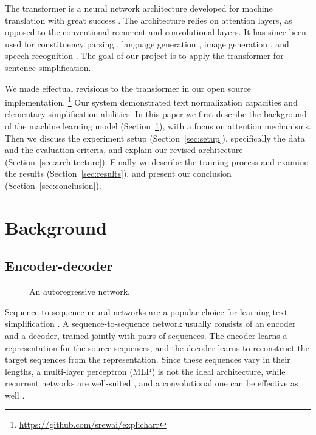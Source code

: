 \documentclass[11pt,twocolumn]{article}
\begin{document}
The transformer is a neural network architecture developed for machine translation
with great success \parencite{vaswani2017attention}.
The architecture relies on attention layers,
as opposed to the conventional recurrent and convolutional layers.
It has since been used for constituency parsing \parencite{kitaev2018constituency},
language generation \parencite{liu2018generating},
image generation \parencite{parmar2018image},
and speech recognition \parencite{zhou2018syllable, zhou2018multilingual}.
The goal of our project is to apply the transformer for sentence simplification.

We made effectual revisions to the transformer in our open source implementation.%
\footnote{\tiny\url{https://github.com/srewai/explicharr}}
Our system demonstrated text normalization capacities and elementary simplification abilities.
In this paper we first describe the background of the machine learning model
(Section~\ref{sec:background}), with a focus on attention mechanisms.
Then we discuss the experiment setup (Section~\ref{sec:setup}),
specifically the data and the evaluation criteria,
and explain our revised architecture (Section~\ref{sec:architecture}).
Finally we describe the training process and examine the results (Section~\ref{sec:results}),
and present our conclusion (Section~\ref{sec:conclusion}).

\section{Background}%
\label{sec:background}

\subsection{Encoder-decoder}

\begin{figure}
  \centering
  \caption[]{\label{fig:autoreg}An autoregressive network.}
\end{figure}

Sequence-to-sequence neural networks are a popular choice for learning text simplification
\parencite{wang2016experimental, zhang2017constrained, vu2018sentence}.
A sequence-to-sequence network usually consists of an encoder and a decoder,
trained jointly with pairs of sequences.
The encoder learns a representation for the source sequences,
and the decoder learns to reconstruct the target sequences from the representation.
Since these sequences vary in their lengths,
a multi-layer perceptron (MLP) is not the ideal architecture,
while recurrent networks are well-suited \parencite{sutskever2014sequence},
and a convolutional one can be effective as well \parencite{gehring2017convolutional}.
\end{document}
